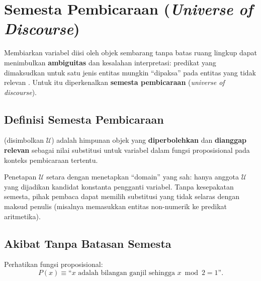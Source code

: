 \section{Semesta Pembicaraan (\textit{Universe of Discourse})}

Membiarkan variabel diisi oleh objek sembarang tanpa batas ruang lingkup dapat menimbulkan \textbf{ambiguitas} dan kesalahan interpretasi: predikat yang dimaksudkan untuk satu jenis entitas mungkin ``dipaksa'' pada entitas yang tidak relevan \cite{rosen2019}. Untuk itu diperkenalkan \textbf{semesta pembicaraan} (\textit{universe of discourse}).

\subsection{Definisi Semesta Pembicaraan}

\begin{definisi}
 (disimbolkan $\mathcal{U}$) adalah himpunan objek yang \textbf{diperbolehkan} dan \textbf{dianggap relevan} sebagai nilai substitusi untuk variabel dalam fungsi proposisional pada konteks pembicaraan tertentu.
\end{definisi}

Penetapan $\mathcal{U}$ setara dengan menetapkan ``domain'' yang sah: hanya anggota $\mathcal{U}$ yang dijadikan kandidat konstanta pengganti variabel. Tanpa kesepakatan semesta, pihak pembaca dapat memilih substitusi yang tidak selaras dengan maksud penulis (misalnya memasukkan entitas non-numerik ke predikat aritmetika).

\subsection{Akibat Tanpa Batasan Semesta}

Perhatikan fungsi proposisional:
\[ P(x) \equiv \text{``}x \text{ adalah bilangan ganjil sehingga } x \bmod 2 = 1\text{''}. \]

